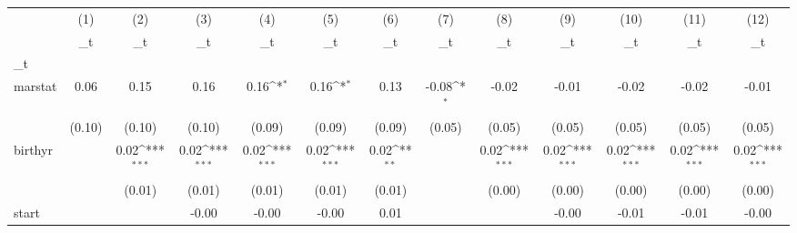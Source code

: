 \documentclass{article}
\begin{document}
{
\def\sym#1{\ifmmode^{#1}\else\(^{#1}\)\fi}
\begin{tabular}{l*{12}{c}}
\hline\hline
            &\multicolumn{1}{c}{(1)}&\multicolumn{1}{c}{(2)}&\multicolumn{1}{c}{(3)}&\multicolumn{1}{c}{(4)}&\multicolumn{1}{c}{(5)}&\multicolumn{1}{c}{(6)}&\multicolumn{1}{c}{(7)}&\multicolumn{1}{c}{(8)}&\multicolumn{1}{c}{(9)}&\multicolumn{1}{c}{(10)}&\multicolumn{1}{c}{(11)}&\multicolumn{1}{c}{(12)}\\
            &\multicolumn{1}{c}{\_t}&\multicolumn{1}{c}{\_t}&\multicolumn{1}{c}{\_t}&\multicolumn{1}{c}{\_t}&\multicolumn{1}{c}{\_t}&\multicolumn{1}{c}{\_t}&\multicolumn{1}{c}{\_t}&\multicolumn{1}{c}{\_t}&\multicolumn{1}{c}{\_t}&\multicolumn{1}{c}{\_t}&\multicolumn{1}{c}{\_t}&\multicolumn{1}{c}{\_t}\\
\hline
\_t          &                     &                     &                     &                     &                     &                     &                     &                     &                     &                     &                     &                     \\
marstat     &        0.06         &        0.15         &        0.16         &        0.16\sym{*}  &        0.16\sym{*}  &        0.13         &       -0.08\sym{*}  &       -0.02         &       -0.01         &       -0.02         &       -0.02         &       -0.01         \\
            &      (0.10)         &      (0.10)         &      (0.10)         &      (0.09)         &      (0.09)         &      (0.09)         &      (0.05)         &      (0.05)         &      (0.05)         &      (0.05)         &      (0.05)         &      (0.05)         \\
[1em]
birthyr     &                     &        0.02\sym{***}&        0.02\sym{***}&        0.02\sym{***}&        0.02\sym{***}&        0.02\sym{**} &                     &        0.02\sym{***}&        0.02\sym{***}&        0.02\sym{***}&        0.02\sym{***}&        0.02\sym{***}\\
            &                     &      (0.01)         &      (0.01)         &      (0.01)         &      (0.01)         &      (0.01)         &                     &      (0.00)         &      (0.00)         &      (0.00)         &      (0.00)         &      (0.00)         \\
[1em]
start       &                     &                     &       -0.00         &       -0.00         &       -0.00         &        0.01         &                     &                     &       -0.00         &       -0.01         &       -0.01         &       -0.00         \\

\end{tabular}}
\end{document}

